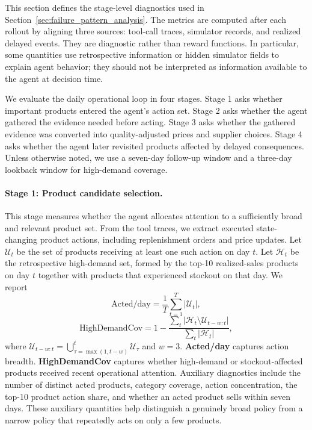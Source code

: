 This section defines the stage-level diagnostics used in Section~\ref{sec:failure_pattern_analysis}. The metrics are computed after each rollout by aligning three sources: tool-call traces, simulator records, and realized delayed events. They are diagnostic rather than reward functions. In particular, some quantities use retrospective information or hidden simulator fields to explain agent behavior; they should not be interpreted as information available to the agent at decision time.

We evaluate the daily operational loop in four stages. Stage 1 asks whether important products entered the agent's action set. Stage 2 asks whether the agent gathered the evidence needed before acting. Stage 3 asks whether the gathered evidence was converted into quality-adjusted prices and supplier choices. Stage 4 asks whether the agent later revisited products affected by delayed consequences. Unless otherwise noted, we use a seven-day follow-up window and a three-day lookback window for high-demand coverage.

\paragraph{Stage 1: Product candidate selection.}
This stage measures whether the agent allocates attention to a sufficiently broad and relevant product set. From the tool traces, we extract executed state-changing product actions, including replenishment orders and price updates. Let $\mathcal{U}_{t}$ be the set of products receiving at least one such action on day $t$. Let $\mathcal{H}_{t}$ be the retrospective high-demand set, formed by the top-10 realized-sales products on day $t$ together with products that experienced stockout on that day. We report
\begin{equation}
\mathrm{Acted/day}
=\frac{1}{T}\sum_{t=1}^{T}|\mathcal{U}_{t}|,
\end{equation}
\begin{equation}
\mathrm{HighDemandCov}
=1-\frac{\sum_t|\mathcal{H}_{t}\setminus\mathcal{U}_{t-w:t}|}
{\sum_t|\mathcal{H}_{t}|},
\end{equation}
where $\mathcal{U}_{t-w:t}=\bigcup_{\tau=\max(1,t-w)}^{t}\mathcal{U}_{\tau}$ and $w=3$. \textbf{Acted/day} captures action breadth. \textbf{HighDemandCov} captures whether high-demand or stockout-affected products received recent operational attention. Auxiliary diagnostics include the number of distinct acted products, category coverage, action concentration, the top-10 product action share, and whether an acted product sells within seven days. These auxiliary quantities help distinguish a genuinely broad policy from a narrow policy that repeatedly acts on only a few products.

